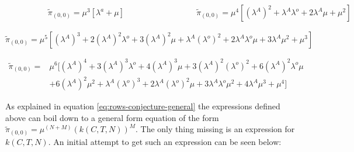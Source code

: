 \begin{multicols}{2}
    \begin{figure}[H]
        \centering
        \scalebox{0.9}{
            }
    \end{figure}
    \columnbreak
    \begin{figure}[H]
        \centering
        \scalebox{0.9}{
            }
    \end{figure}
\end{multicols}
\vspace{-0.5cm}
\begin{alignat}{2} \label{eq:00_rate_1131}
    \hspace{4em} & \tilde{\pi}_{(0,0)} = \mu^3[\lambda^a + \mu] \hspace{8em} & 
    \tilde{\pi}_{(0,0)} = \mu^4[(\lambda^A)^2 + \lambda^A \lambda^o + 2\lambda^A 
    \mu + \mu^2] 
\end{alignat}


\begin{figure}[h]
    \centering
    \scalebox{0.8}{
        }
\end{figure}
\begin{equation}\label{eq:00_rate_1141}
    \tilde{\pi}_{(0,0)} = \mu^5[(\lambda^A)^3 + 2(\lambda^A)^2 \lambda^o + 
    3(\lambda^A)^2 \mu + \lambda^A (\lambda^o)^2 + 2\lambda^A \lambda^o \mu + 
    3\lambda^A \mu^2 + \mu^3]
\end{equation}

\begin{figure}[h]
    \centering
    \scalebox{0.8}{
        }
\end{figure}
\begin{align}\label{eq:00_rate_1151}
    \tilde{\pi}_{(0,0)} =& \mu^6[(\lambda^A)^4 + 3(\lambda^A)^3 \lambda^o + 
    4(\lambda^A)^3 \mu + 3(\lambda^A)^2 (\lambda^o)^2 + 
    6(\lambda^A)^2 \lambda^o \mu \\
    & + 6(\lambda^A)^2 \mu^2 + \lambda^A (\lambda^o)^3 + 
    2\lambda^A (\lambda^o)^2 \mu + 3\lambda^A \lambda^o \mu^2 + 
    4\lambda^A \mu^3 + \mu^4] \nonumber
\end{align}

\newpage
As explained in equation \ref{eq:rows-conjecture-general} the expressions defined 
above can boil down to a general form equation of the form 
\(\tilde{\pi}_{(0,0)} = \mu^{(N+M)} (k(C,T,N))^M\). 
The only thing missing is an expression for \(k(C,T,N)\). 
An initial attempt to get such an expression can be seen below:


